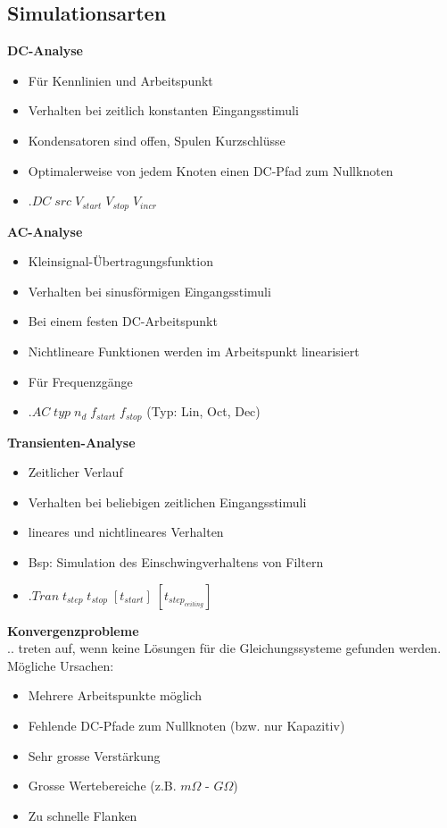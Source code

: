 	\subsection{Simulationsarten}
	\begin{multicols}{2}
			{\bf DC-Analyse}
			\begin{itemize}
				\item Für Kennlinien und Arbeitspunkt
				\item Verhalten bei zeitlich konstanten Eingangsstimuli
				\item Kondensatoren sind offen, Spulen Kurzschlüsse
				\item Optimalerweise von jedem Knoten einen DC-Pfad zum Nullknoten
				\item $.DC \; src \; V_{start} \; V_{stop} \; V_{incr}$
			\end{itemize}
			{\bf AC-Analyse}
			\begin{itemize}
				\item Kleinsignal-Übertragungsfunktion
				\item Verhalten bei sinusförmigen Eingangsstimuli
				\item Bei einem festen DC-Arbeitspunkt
				\item Nichtlineare Funktionen werden im Arbeitspunkt linearisiert
				\item Für Frequenzgänge
				\item $.AC \; typ \; n_d \; f_{start} \; f_{stop}$ (Typ: Lin, Oct, Dec)
			\end{itemize}
	\columnbreak
			{\bf Transienten-Analyse}
			\begin{itemize}
				\item Zeitlicher Verlauf
				\item Verhalten bei beliebigen zeitlichen Eingangsstimuli
				\item lineares und nichtlineares Verhalten
				\item Bsp: Simulation des Einschwingverhaltens von Filtern
				\item $.Tran \; t_{step} \; t_{stop} \; [t_{start}] \; [t_{step_{ceiling}}]$
			\end{itemize}
			{\bf Konvergenzprobleme} \\
			.. treten auf, wenn keine Lösungen für die Gleichungssysteme gefunden werden.\\
			Mögliche Ursachen: \\
			\begin{itemize}
				\item Mehrere Arbeitspunkte möglich
				\item Fehlende DC-Pfade zum Nullknoten (bzw. nur Kapazitiv)
				\item Sehr grosse Verstärkung
				\item Grosse Wertebereiche (z.B. $m \Omega$ - $G \Omega$)
				\item Zu schnelle Flanken
			\end{itemize}
	\end{multicols}